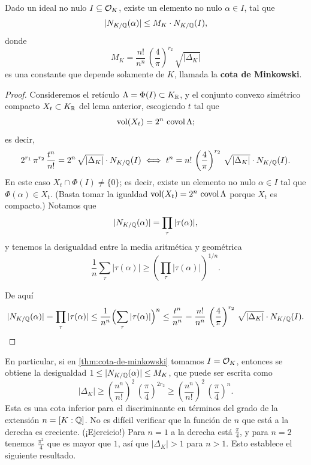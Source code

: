 \begin{teorema}
  \label{thm:cota-de-minkowski}
  Dado un ideal no nulo $I \subseteq \mathcal{O}_K$, existe un elemento no nulo
  $\alpha \in I$, tal que
  $$|N_{K/\mathbb{Q}} (\alpha)| \le M_K\cdot N_{K/\mathbb{Q}} (I),$$
  donde
  $$M_K = \frac{n!}{n^n} \, \left(\frac{4}{\pi}\right)^{r_2} \, \sqrt{|\Delta_K|}$$
  es una constante que depende solamente de $K$, llamada la
  \textbf{cota de Minkowski}.

  \begin{proof}
    Consideremos el retículo $\Lambda = \Phi (I) \subset K_{\mathbb{R}}$, y el conjunto
    convexo simétrico compacto $X_t \subset K_{\mathbb{R}}$ del lema anterior, escogiendo
    $t$ tal que
    $$\operatorname{vol} (X_t) = 2^n \, \operatorname{covol} \Lambda;$$
    es decir,
    \[ 2^{r_1}\,\pi^{r_2}\,\frac{t^n}{n!} = 2^n\,\sqrt{|\Delta_K|} \cdot N_{K/\mathbb{Q}} (I)
       \iff
       t^n = n!\,\left(\frac{4}{\pi}\right)^{r_2}\,\sqrt{|\Delta_K|}\cdot N_{K/\mathbb{Q}} (I). \]
    En este caso $X_t \cap \Phi (I) \ne \{ 0 \}$; es decir, existe un elemento
    no nulo $\alpha \in I$ tal que $\Phi (\alpha) \in X_t$. (Basta tomar la igualdad
    $\operatorname{vol} (X_t) = 2^n \, \operatorname{covol} \Lambda$ porque $X_t$ es compacto.) Notamos que
    $$|N_{K/\mathbb{Q}} (\alpha)| = \prod_\tau |\tau (\alpha)|,$$
    y tenemos la desigualdad entre la media aritmética y geométrica
    $$\frac{1}{n} \sum_\tau |\tau (\alpha)| \ge \left(\prod_\tau |\tau (\alpha)|\right)^{1/n}.$$

    De aquí
    \[ |N_{K/\mathbb{Q}} (\alpha)| = \prod_\tau |\tau (\alpha)| \le \frac{1}{n^n} \Bigl(\sum_\tau |\tau (\alpha)|\Bigr)^n \le \frac{t^n}{n^n} = \frac{n!}{n^n}\,\left(\frac{4}{\pi}\right)^{r_2}\,\sqrt{|\Delta_K|}\cdot N_{K/\mathbb{Q}} (I). \qedhere \]
  \end{proof}
\end{teorema}

En particular, si en \ref{thm:cota-de-minkowski} tomamos $I = \mathcal{O}_K$, entonces se
obtiene la desigualdad $1 \le |N_{K/\mathbb{Q}} (\alpha)| \le M_K$, que puede ser
escrita como
\[ |\Delta_K| \ge \left(\frac{n^n}{n!}\right)^2 \, \left(\frac{\pi}{4}\right)^{2r_2}
              \ge \left(\frac{n^n}{n!}\right)^2 \, \left(\frac{\pi}{4}\right)^n. \]
Esta es una cota inferior para el discriminante en términos del grado de la
extensión $n = [K : \mathbb{Q}]$. No es difícil verificar que la función de $n$ que
está a la derecha es creciente. (¡Ejercicio!) Para $n = 1$ a la derecha está
$\frac{\pi}{4}$, y para $n = 2$ tenemos $\frac{\pi^2}{4}$ que es mayor que $1$,
así que $|\Delta_K| > 1$ para $n > 1$.  Esto establece el siguiente resultado.

